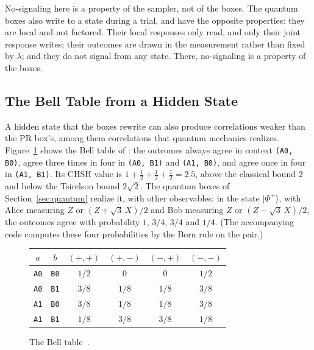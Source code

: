 \documentclass[11pt]{article}
\makeatletter
\newcommand{\hs}{\lstinline[style=hask,basicstyle=\ttfamily,frame=none]}
\newcommand{\tA}[1]{\texttt{A#1}}
\newcommand{\tB}[1]{\texttt{B#1}}
\newcommand{\idealtable}[4]{{\small\renewcommand{\arraystretch}{1.12}%
  \begin{tabular}{@{}cc|cccc@{}}
  $a$ & $b$ & $(+,+)$ & $(+,-)$ & $(-,+)$ & $(-,-)$\\ \hline
  \tA0 & \tB0 & #1\\ \tA0 & \tB1 & #2\\ \tA1 & \tB0 & #3\\ \tA1 & \tB1 & #4
  \end{tabular}}}
\makeatother
\begin{document}
No-signaling here is a property of the sampler, not of the boxes. The quantum boxes also write to a state during a trial, and have the opposite properties: they are local and not factored. Their local responses only read, and only their joint response writes; their outcomes are drawn in the measurement rather than fixed by $\lambda$; and they do not signal from any state. There, no-signaling is a property of the boxes.

\subsection{The Bell Table from a Hidden State}\label{sec:belltable}

A hidden state that the boxes rewrite can also produce correlations weaker than the PR box's, among them correlations that quantum mechanics realizes. Figure~\ref{fig:belltable} shows the Bell table of \citet{Abramsky2017}: the outcomes always agree in context \hs|(A0, B0)|, agree three times in four in \hs|(A0, B1)| and \hs|(A1, B0)|, and agree once in four in \hs|(A1, B1)|. Its CHSH value is $1 + \frac12 + \frac12 + \frac12 = 2.5$, above the classical bound $2$ and below the Tsirelson bound $2\sqrt2$. The quantum boxes of Section~\ref{sec:quantum} realize it, with other observables: in the state $|\Phi^+\rangle$, with Alice measuring $Z$ or $(Z + \sqrt3\,X)/2$ and Bob measuring $Z$ or $(Z - \sqrt3\,X)/2$, the outcomes agree with probability $1$, $3/4$, $3/4$ and $1/4$. (The accompanying code computes these four probabilities by the Born rule on the pair.)

\begin{figure}[htbp]
\centering
\idealtable{$1/2$ & $0$ & $0$ & $1/2$}{$3/8$ & $1/8$ & $1/8$ & $3/8$}{$3/8$ & $1/8$ & $1/8$ & $3/8$}{$1/8$ & $3/8$ & $3/8$ & $1/8$}
\caption{The Bell table~\citep[Figure~3]{Abramsky2017}.}
\label{fig:belltable}
\end{figure}
\end{document}
